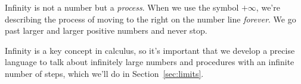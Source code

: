 			Infinity is not a number but a \emph{process}.
			When we use the symbol $+\infty$,
			we're describing the process of moving to the right on the number line \emph{forever}.
			We go past larger and larger positive numbers and never stop.

			Infinity is a key concept in calculus,
			so it's important that we develop a precise language to talk about
			infinitely large numbers and procedures with an infinite number of steps,
			which we'll do in Section~\ref{sec:limits}.










